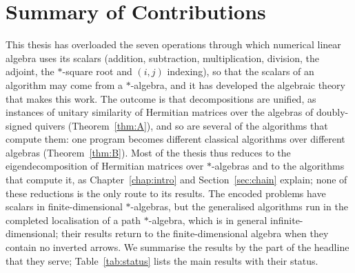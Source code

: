 \documentclass[12pt, a4paper]{report}
\theoremstyle{plain}
\theoremstyle{definition}
\theoremstyle{remark}
\theoremstyle{plain}
\begin{document}
\section{Summary of Contributions}
\label{sec:summary}
This thesis has overloaded the seven operations through which numerical linear algebra uses its scalars (addition, subtraction, multiplication, division, the adjoint, the $*$-square root and $(i,j)$ indexing), so that the scalars of an algorithm may come from a $*$-algebra, and it has developed the algebraic theory that makes this work. The outcome is that decompositions are unified, as instances of unitary similarity of Hermitian matrices over the algebras of doubly-signed quivers (Theorem~\ref{thm:A}), and so are several of the algorithms that compute them: one program becomes different classical algorithms over different algebras (Theorem~\ref{thm:B}). Most of the thesis thus reduces to the eigendecomposition of Hermitian matrices over $*$-algebras and to the algorithms that compute it, as Chapter~\ref{chap:intro} and Section~\ref{sec:chain} explain; none of these reductions is the only route to its results. The encoded problems have scalars in finite-dimensional $*$-algebras, but the generalised algorithms run in the completed localisation of a path $*$-algebra, which is in general infinite-dimensional; their results return to the finite-dimensional algebra when they contain no inverted arrows. We summarise the results by the part of the headline that they serve; Table~\ref{tab:status} lists the main results with their status.
\end{document}
